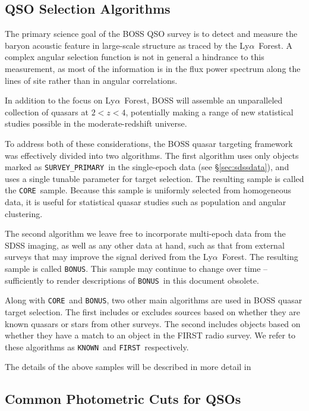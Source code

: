 \documentclass[12pt,preprint]{aastex}
\newcommand{\Lyaf}{Ly$\alpha$~Forest}
\newcommand{\core}{\texttt{CORE}}
\newcommand{\bonus}{\texttt{BONUS}}
\newcommand{\primary}{\texttt{SURVEY\_PRIMARY}}
\newcommand{\known}{\texttt{KNOWN}}
\newcommand{\first}{\texttt{FIRST}}
\begin{document}
\subsection{QSO Selection Algorithms}

The primary science goal of the BOSS QSO survey is to detect and measure
the baryon acoustic feature in large-scale structure as traced by
the \Lyaf. A complex angular selection function is not in general a
hindrance to this measurement, as most of the information is in the
flux power spectrum along the lines of site rather than in angular
correlations.

In addition to the focus on \Lyaf, BOSS will assemble an unparalleled
collection of quasars at $2 < z < 4$, potentially making a range of new
statistical studies possible in the moderate-redshift universe.

To address both of these considerations, the BOSS quasar targeting
framework was effectively divided into two algorithms. The first
algorithm uses only objects marked as \primary\ in the single-epoch
data (see \S \ref{sec:sdssdata}), and uses a single tunable parameter
for target selection. The resulting sample is called the \core\ sample.
Because this sample is uniformly selected from homogeneous data, it is
useful for statistical quasar studies such as population and angular
clustering.

The second algorithm we leave free to incorporate multi-epoch data from 
the SDSS imaging, as well as any other data at hand, such as that
from external surveys that may improve the signal derived from
the \Lyaf.  The resulting sample is called \bonus.  This sample
may continue to change over time -- sufficiently to render 
descriptions of \bonus\ in this document obsolete.

Along with \core\ and \bonus, two other main algorithms are used in BOSS
quasar target selection. The first includes or excludes sources based on
whether they are known quasars or stars from other surveys. The second
includes objects based on whether they have a match to an object in the
FIRST radio survey. We refer to these algorithms as \known\ and \first\
respectively.  

The details of the above samples will be described in more detail in


\subsection{Common Photometric Cuts for QSOs}
\end{document}
